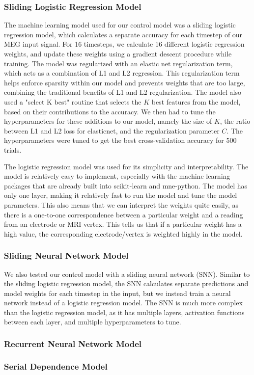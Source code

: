 \documentclass[../main.tex]{subfiles}
\begin{document}
\subsubsection{Sliding Logistic Regression Model}
The machine learning model used for our control model was a sliding logistic regression model, which calculates a separate accuracy for each timestep of our MEG input signal. For 16 timesteps, we calculate 16 different logistic regression weights, and update these weights using a gradient descent procedure while training. The model was regularized with an elastic net regularization term, which acts as a combination of L1 and L2 regression. This regularization term helps enforce sparsity within our model and prevents weights that are too large, combining the traditional benefits of L1 and L2 regularization. The model also used a "select K best" routine that selects the $K$ best features from the model, based on their contributions to the accuracy. We then had to tune the hyperparameters for these additions to our model, namely the size of $K$, the ratio between L1 and L2 loss for elasticnet, and the regularization parameter $C$. The hyperparameters were tuned to get the best cross-validation accuracy for 500 trials.


The logistic regression model was used for its simplicity and interpretability. The model is relatively easy to implement, especially with the machine learning packages that are already built into scikit-learn and mne-python. The model has only one layer, making it relatively fast to run the model and tune the model parameters. This also means that we can interpret the weights quite easily, as there is a one-to-one correspondence between a particular weight and a reading from an electrode or MRI vertex. This tells us that if a particular weight has a high value, the corresponding electrode/vertex is weighted highly in the model.

\subsubsection{Sliding Neural Network Model}
We also tested our control model with a sliding neural network (SNN). Similar to the sliding logistic regression model, the SNN calculates separate predictions and model weights for each timestep in the input, but we instead train a neural network instead of a logistic regression model. The SNN is much more complex than the logistic regression model, as it has multiple layers, activation functions between each layer, and multiple hyperparameters to tune.

\subsubsection{Recurrent Neural Network Model}

\subsubsection{Serial Dependence Model}
\end{document}
